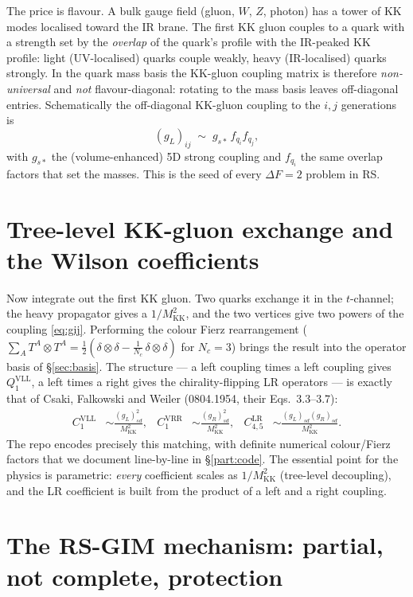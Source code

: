 \documentclass[11pt]{article}
\newcommand{\MKK}{M_{\mathrm{KK}}}
\newcommand{\half}{\tfrac{1}{2}}
\newcommand{\gss}{g_{s*}}
\newcommand{\QVLL}{Q_1^{\mathrm{VLL}}}
\theoremstyle{definition}
\begin{document}
The price is flavour. A bulk gauge field (gluon, $W$, $Z$, photon) has a tower of
KK modes localised toward the IR brane. The first KK gluon couples to a quark with
a strength set by the \emph{overlap} of the quark's profile with the IR-peaked KK
profile: light (UV-localised) quarks couple weakly, heavy (IR-localised) quarks
strongly. In the quark mass basis the KK-gluon coupling matrix is therefore
\emph{non-universal} and \emph{not} flavour-diagonal: rotating to the mass basis
leaves off-diagonal entries. Schematically the off-diagonal KK-gluon coupling to
the $i,j$ generations is
\begin{equation}
(g_L)_{ij} \;\sim\; \gss\, f_{q_i} f_{q_j},
\label{eq:gij}
\end{equation}
with $\gss$ the (volume-enhanced) 5D strong coupling and $f_{q_i}$ the same
overlap factors that set the masses. This is the seed of every $\Delta F=2$
problem in RS.

\section{Tree-level KK-gluon exchange and the Wilson coefficients}
\label{sec:treelevel}

Now integrate out the first KK gluon. Two quarks exchange it in the $t$-channel;
the heavy propagator gives a $1/\MKK^2$, and the two vertices give two powers of
the coupling \eqref{eq:gij}. Performing the colour Fierz rearrangement
($\sum_A T^A\otimes T^A = \half(\delta\otimes\delta - \tfrac1{N_c}\,\delta\otimes\delta)$
for $N_c=3$) brings the result into the operator basis of
\S\ref{sec:basis}. The structure --- a left coupling times a left coupling gives
$\QVLL$, a left times a right gives the chirality-flipping LR operators --- is
exactly that of Csaki, Falkowski and Weiler (0804.1954, their Eqs.~3.3--3.7):
\begin{align}
C_1^{\mathrm{VLL}} &\sim \frac{(g_L)_{sd}^2}{\MKK^2}, &
C_1^{\mathrm{VRR}} &\sim \frac{(g_R)_{sd}^2}{\MKK^2}, &
C_{4,5}^{\mathrm{LR}} &\sim \frac{(g_L)_{sd}(g_R)_{sd}}{\MKK^2}.
\label{eq:wilsonscaling}
\end{align}
The repo encodes precisely this matching, with definite numerical colour/Fierz
factors that we document line-by-line in \S\ref{part:code}. The essential point
for the physics is parametric: \emph{every} coefficient scales as
$1/\MKK^2$ (tree-level decoupling), and the LR coefficient is built from the
product of a left and a right coupling.

\section{The RS-GIM mechanism: partial, not complete, protection}
\label{sec:rsgim}
\end{document}
